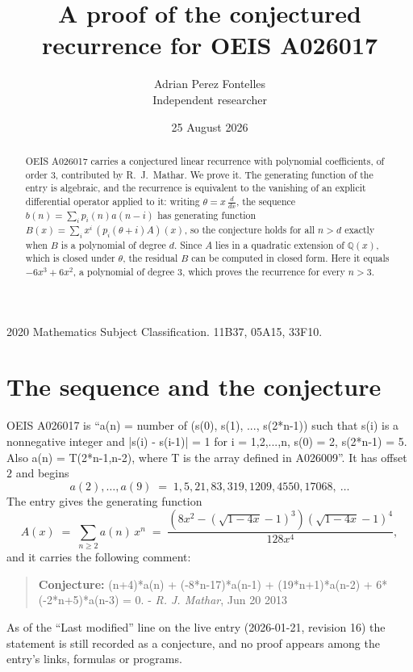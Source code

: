 \documentclass[11pt,a4paper]{article}
\title{A proof of the conjectured recurrence for OEIS A026017}
\author{Adrian Perez Fontelles\\ \small Independent researcher}
\date{25 August 2026}
\theoremstyle{plain}
\theoremstyle{definition}
\begin{document}
\maketitle

\begin{abstract}
OEIS A026017 carries a conjectured linear recurrence with polynomial coefficients, of
order 3, contributed by R.~J.~Mathar. We prove it. The generating function of the
entry is algebraic, and the recurrence is equivalent to the vanishing of an explicit
differential operator applied to it: writing $\theta=x\,\frac{d}{dx}$, the sequence
$b(n)=\sum_{i}p_{i}(n)a(n-i)$ has generating function
$B(x)=\sum_{i}x^{i}\,(p_{i}(\theta+i)A)(x)$, so the conjecture holds for all $n>d$ exactly
when $B$ is a polynomial of degree $d$. Since $A$ lies in a quadratic extension of
$\mathbb{Q}(x)$, which is closed under $\theta$, the residual $B$ can be computed in
closed form. Here it equals $- 6 x^{3} + 6 x^{2}$, a polynomial of degree $3$, which proves
the recurrence for every $n>3$.
\end{abstract}

\noindent\small 2020 Mathematics Subject Classification. 11B37, 05A15, 33F10.\normalsize

\section{The sequence and the conjecture}

OEIS A026017 is ``a(n) = number of (s(0), s(1), ..., s(2*n-1)) such that s(i) is a nonnegative integer and |s(i) - s(i-1)| = 1 for i = 1,2,...,n, s(0) = 2, s(2*n-1) = 5. Also a(n) = T(2*n-1,n-2), where T is the array defined in A026009''. It has offset $2$ and begins
\[
a(2),\dots,a(9)\;=\;1, 5, 21, 83, 319, 1209, 4550, 17068,\ \dots
\]
The entry gives the generating function
\begin{equation}\label{eq:gf}
A(x)\;=\;\sum_{n\ge 2} a(n)\,x^{n}\;=\;\frac{\left(8 x^{2} - \left(\sqrt{1 - 4 x} - 1\right)^{3}\right) \left(\sqrt{1 - 4 x} - 1\right)^{4}}{128 x^{4}} ,
\end{equation}
and it carries the following comment:
\begin{quote}\small
\textbf{Conjecture:} (n+4)*a(n) + (-8*n-17)*a(n-1) + (19*n+1)*a(n-2) + 6*(-2*n+5)*a(n-3) = 0. - \emph{R. J. Mathar}, Jun 20 2013
\end{quote}
As of the ``Last modified'' line on the live entry (2026-01-21, revision 16) the
statement is still recorded as a conjecture, and no proof appears among the entry's links,
formulas or programs.
\end{document}
